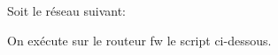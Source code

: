 
Soit le réseau suivant:
\begin{center}\end{center}

On exécute sur le routeur fw le script ci-dessous.


